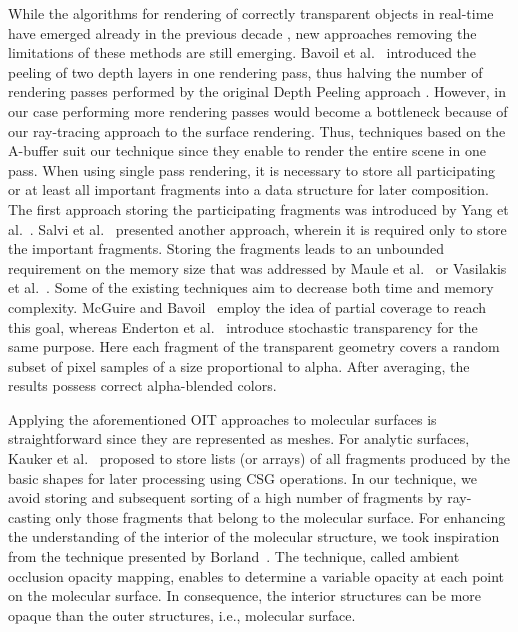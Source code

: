 While the algorithms for rendering of correctly transparent objects in real-time have emerged already in the previous decade \cite{everitt2001interactive}, new approaches removing the limitations of these methods are still emerging.
Bavoil et al.~\cite{bavoil2008order} introduced the peeling of two depth layers in one rendering pass, thus halving the number of rendering passes performed by the original Depth Peeling approach \cite{everitt2001interactive}. However, in our case performing more rendering passes would become a bottleneck because of our ray-tracing approach to the surface rendering.
Thus, techniques based on the A-buffer suit our technique since they enable to render the entire scene in one pass.
When using single pass rendering, it is necessary to store all participating or at least all important fragments into a data structure for later composition.
The first approach storing the participating fragments was introduced by Yang et al.~\cite{yang2010real}. Salvi et al.~\cite{salvi2011adaptive} presented another approach, wherein it is required only to store the important fragments.
Storing the fragments leads to an unbounded requirement on the memory size that was addressed by Maule et al.~\cite{maule2012memory} or Vasilakis et al.~\cite{vasilakis2015k+buffer}.
Some of the existing techniques aim to decrease both time and memory complexity.
McGuire and Bavoil~\cite{mcguire2013weighted} employ the idea of partial coverage to reach this goal, whereas Enderton et al.~\cite{enderton2011stochastic} introduce stochastic transparency for the same purpose. 
Here each fragment of the transparent geometry covers a random subset of pixel samples of a size proportional to alpha. 
After averaging, the results possess correct alpha-blended colors. 

Applying the aforementioned OIT approaches to molecular surfaces is straightforward since they are represented as meshes.
For analytic surfaces, Kauker et al.~\cite{kauker2013rendering} proposed to store lists (or arrays) of all fragments produced by the basic shapes for later processing using CSG operations.
In our technique, we avoid storing and subsequent sorting of a high number of fragments by ray-casting only those fragments that belong to the molecular surface.
For enhancing the understanding of the interior of the molecular structure, we took inspiration from the technique presented by Borland~\cite{borland2011ambient}. 
The technique, called ambient occlusion opacity mapping, enables to determine a variable opacity at each point on the molecular surface.
In consequence, the interior structures can be more opaque than the outer structures, i.e., molecular surface.

